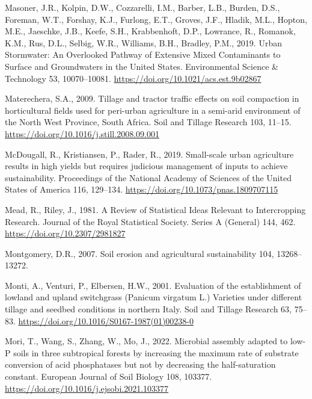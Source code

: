 \documentclass[
  12pt,
]{article}
\newlength{\cslhangindent}
\newlength{\cslentryspacingunit} %
\newenvironment{CSLReferences}[2] %
 {%
  \setlength{\parindent}{0pt}
  \ifodd #1
  \let\oldpar\par
  \def\par{\hangindent=\cslhangindent\oldpar}
  \fi
  \setlength{\parskip}{#2\cslentryspacingunit}
 }%
 {}
\begin{document}
\begin{CSLReferences}{1}{0}
\leavevmode{}%
Masoner, J.R., Kolpin, D.W., Cozzarelli, I.M., Barber, L.B., Burden, D.S., Foreman, W.T., Forshay, K.J., Furlong, E.T., Groves, J.F., Hladik, M.L., Hopton, M.E., Jaeschke, J.B., Keefe, S.H., Krabbenhoft, D.P., Lowrance, R., Romanok, K.M., Rus, D.L., Selbig, W.R., Williams, B.H., Bradley, P.M., 2019. Urban {Stormwater}: {An Overlooked Pathway} of {Extensive Mixed Contaminants} to {Surface} and {Groundwaters} in the {United States}. Environmental Science \& Technology 53, 10070--10081. \url{https://doi.org/10.1021/acs.est.9b02867}

\leavevmode{}%
Materechera, S.A., 2009. Tillage and tractor traffic effects on soil compaction in horticultural fields used for peri-urban agriculture in a semi-arid environment of the {North West Province}, {South Africa}. Soil and Tillage Research 103, 11--15. \url{https://doi.org/10.1016/j.still.2008.09.001}

\leavevmode{}%
McDougall, R., Kristiansen, P., Rader, R., 2019. Small-scale urban agriculture results in high yields but requires judicious management of inputs to achieve sustainability. Proceedings of the National Academy of Sciences of the United States of America 116, 129--134. \url{https://doi.org/10.1073/pnas.1809707115}

\leavevmode{}%
Mead, R., Riley, J., 1981. A {Review} of {Statistical Ideas Relevant} to {Intercropping Research}. Journal of the Royal Statistical Society. Series A (General) 144, 462. \url{https://doi.org/10.2307/2981827}

\leavevmode{}%
Montgomery, D.R., 2007. Soil erosion and agricultural sustainability 104, 13268--13272.

\leavevmode{}%
Monti, A., Venturi, P., Elbersen, H.W., 2001. Evaluation of the establishment of lowland and upland switchgrass ({Panicum} virgatum {L}.) Varieties under different tillage and seedbed conditions in northern {Italy}. Soil and Tillage Research 63, 75--83. \url{https://doi.org/10.1016/S0167-1987(01)00238-0}

\leavevmode{}%
Mori, T., Wang, S., Zhang, W., Mo, J., 2022. Microbial assembly adapted to low-{P} soils in three subtropical forests by increasing the maximum rate of substrate conversion of acid phosphatases but not by decreasing the half-saturation constant. European Journal of Soil Biology 108, 103377. \url{https://doi.org/10.1016/j.ejsobi.2021.103377}


\end{CSLReferences}
\end{document}
